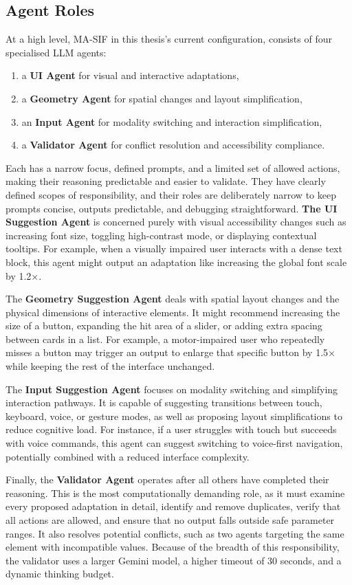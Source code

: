 \subsection{Agent Roles}
At a high level, MA-SIF in this thesis's current configuration, consists of four specialised LLM agents: 
\begin{enumerate}
    \item a \textbf{UI Agent} for visual and interactive adaptations, 
    \item a \textbf{Geometry Agent} for spatial changes and layout simplification, 
    \item an \textbf{Input Agent} for modality switching and interaction simplification, 
    \item a \textbf{Validator Agent} for conflict resolution and accessibility compliance. 
\end{enumerate}
Each has a narrow focus, defined prompts, and a limited set of allowed actions, making their reasoning predictable and easier to validate. They have clearly defined scopes of responsibility, and their roles are deliberately narrow to keep prompts concise, outputs predictable, and debugging straightforward. \textbf{The UI Suggestion Agent} is concerned purely with visual accessibility changes such as increasing font size, toggling high-contrast mode, or displaying contextual tooltips. For example, when a visually impaired user interacts with a dense text block, this agent might output an adaptation like increasing the global font scale by 1.2×.

The \textbf{Geometry Suggestion Agent} deals with spatial layout changes and the physical dimensions of interactive elements. It might recommend increasing the size of a button, expanding the hit area of a slider, or adding extra spacing between cards in a list. For example, a motor-impaired user who repeatedly misses a button may trigger an output to enlarge that specific button by 1.5× while keeping the rest of the interface unchanged.

The \textbf{Input Suggestion Agent} focuses on modality switching and simplifying interaction pathways. It is capable of suggesting transitions between touch, keyboard, voice, or gesture modes, as well as proposing layout simplifications to reduce cognitive load. For instance, if a user struggles with touch but succeeds with voice commands, this agent can suggest switching to voice-first navigation, potentially combined with a reduced interface complexity.

Finally, the \textbf{Validator Agent} operates after all others have completed their reasoning. This is the most computationally demanding role, as it must examine every proposed adaptation in detail, identify and remove duplicates, verify that all actions are allowed, and ensure that no output falls outside safe parameter ranges. It also resolves potential conflicts, such as two agents targeting the same element with incompatible values. Because of the breadth of this responsibility, the validator uses a larger Gemini model, a higher timeout of 30 seconds, and a dynamic thinking budget.

